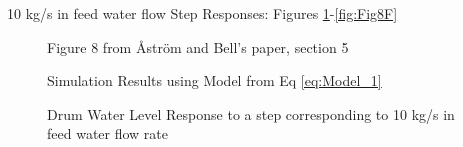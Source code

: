         10 kg/s in feed water flow Step Responses: Figures \ref{fig:Fig8A}-\ref{fig:Fig8F}
        \begin{figure}[ht]
            \begin{center}
                
                Figure 8 from \r{A}str\"{o}m and Bell's paper, section 5 \cite{Astrom}
                
                
                Simulation Results using Model from Eq \eqref{eq:Model_1}
                
                \caption{Drum Water Level Response to a step corresponding to 10 kg/s in feed water flow rate}
                \label{fig:Fig8A}
            \end{center}
        \end{figure}  %
